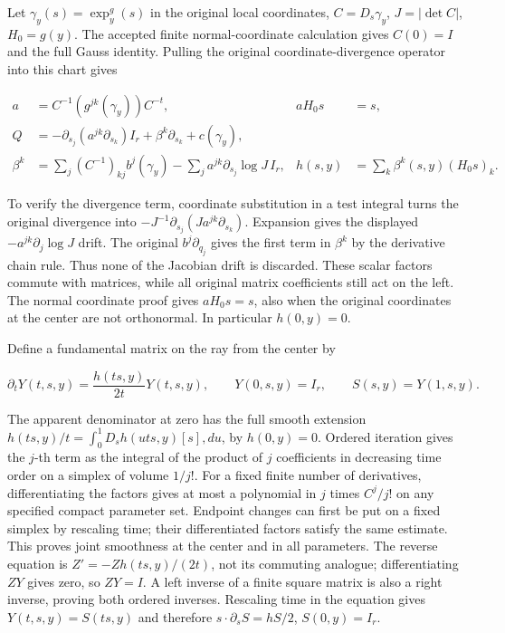\documentclass[
  11pt,
]{article}
\begin{document}
Let \(\gamma_y(s)=\exp_y^g(s)\) in the original local coordinates,
\(C=D_s\gamma_y\), \(J=|\det C|\), \(H_0=g(y)\). The accepted finite
normal-coordinate calculation gives \(C(0)=I\) and the full Gauss
identity. Pulling the original coordinate-divergence operator into this
chart gives

\[
\begin{aligned}
 a&=C^{-1}(g^{jk}(\gamma_y))C^{-t},& aH_0s&=s,\\
 Q&=-\partial_{s_j}(a^{jk}\partial_{s_k})I_r
                         +\beta^k\partial_{s_k}+c(\gamma_y),\\
 \beta^k&=\sum_j(C^{-1})_{kj}b^j(\gamma_y)
            -\sum_j a^{jk}\partial_{s_j}\log J\,I_r,&
 h(s,y)&=\sum_k\beta^k(s,y)(H_0s)_k .
\end{aligned}\tag{FW10}
\]

To verify the divergence term, coordinate substitution in a test
integral turns the original divergence into
\(-J^{-1}\partial_{s_j}(Ja^{jk}\partial_{s_k})\). Expansion gives the
displayed \(-a^{jk}\partial_j\log J\) drift. The original
\(b^j\partial_{q_j}\) gives the first term in \(\beta^k\) by the
derivative chain rule. Thus none of the Jacobian drift is discarded.
These scalar factors commute with matrices, while all original matrix
coefficients still act on the left. The normal coordinate proof gives
\(aH_0s=s\), also when the original coordinates at the center are not
orthonormal. In particular \(h(0,y)=0\).

Define a fundamental matrix on the ray from the center by

\[
 \partial_tY(t,s,y)=\frac{h(ts,y)}{2t}Y(t,s,y),\qquad
 Y(0,s,y)=I_r,\qquad S(s,y)=Y(1,s,y).\tag{FW11}
\]

The apparent denominator at zero has the full smooth extension
\(h(ts,y)/t=\int_0^1D_sh(uts,y)[s],du\), by \(h(0,y)=0\). Ordered
iteration gives the \(j\)-th term as the integral of the product of
\(j\) coefficients in decreasing time order on a simplex of volume
\(1/j!\). For a fixed finite number of derivatives, differentiating the
factors gives at most a polynomial in \(j\) times \(C^j/j!\) on any
specified compact parameter set. Endpoint changes can first be put on a
fixed simplex by rescaling time; their differentiated factors satisfy
the same estimate. This proves joint smoothness at the center and in all
parameters. The reverse equation is \(Z'=-Zh(ts,y)/(2t)\), not its
commuting analogue; differentiating \(ZY\) gives zero, so \(ZY=I\). A
left inverse of a finite square matrix is also a right inverse, proving
both ordered inverses. Rescaling time in the equation gives
\(Y(t,s,y)=S(ts,y)\) and therefore \(s\cdot\partial_sS=hS/2\),
\(S(0,y)=I_r\).
\end{document}
